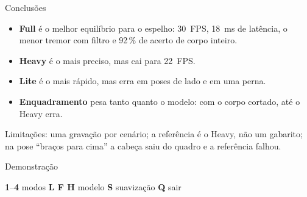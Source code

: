 \documentclass[aspectratio=169,12pt]{beamer}
\newcommand{\leg}[1]{{\small\textcolor{cinza}{#1}}}
\begin{document}
\begin{frame}{Conclusões}

  \begin{itemize}
    \item \textbf{Full} é o melhor equilíbrio para o espelho: 30~FPS, 18~ms de latência,
      o menor tremor com filtro e 92\,\% de acerto de corpo inteiro.
    \item \textbf{Heavy} é o mais preciso, mas cai para 22~FPS.
    \item \textbf{Lite} é o mais rápido, mas erra em poses de lado e em uma perna.
    \item \textbf{Enquadramento} pesa tanto quanto o modelo: com o corpo cortado,
      até o Heavy erra.
  \end{itemize}

  \vspace{.3em}
  \leg{Limitações: uma gravação por cenário; a referência é o Heavy, não um gabarito;
  na pose ``braços para cima'' a cabeça saiu do quadro e a referência falhou.}

\end{frame}

\begin{frame}[standout]

  Demonstração

  \vspace{.8em}
  {\normalsize\mdseries
  \textbf{1}–\textbf{4} modos \qquad
  \textbf{L F H} modelo \qquad
  \textbf{S} suavização \qquad
  \textbf{Q} sair}

\end{frame}
\end{document}
